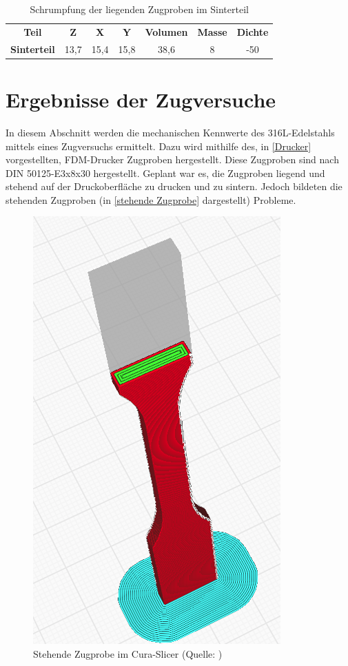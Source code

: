 \begin{table}[h]
    \centering
    \caption{Schrumpfung der liegenden Zugproben im Sinterteil}
      \begin{tabular}{ccccccc}
      \toprule
      \textbf{Teil} & \multicolumn{1}{c}{\textbf{Z}} & \multicolumn{1}{c}{\textbf{X}} & \multicolumn{1}{c}{\textbf{Y}} & \multicolumn{1}{c}{\textbf{Volumen}} & \multicolumn{1}{c}{\textbf{Masse}} & \multicolumn{1}{c}{\textbf{Dichte}} \\
        \textbf{Sinterteil} & 13,7 & 15,4 & 15,8 & 38,6 & 8 & -50 \\
      \bottomrule
      \end{tabular}%
    \label{Schrumpfung Zugproben}%
  \end{table}%
  \FloatBarrier

\section{Ergebnisse der Zugversuche}

In diesem Abschnitt werden die mechanischen Kennwerte des 316L-Edelstahls mittels eines Zugversuchs ermittelt. Dazu wird mithilfe des, in \autoref{Drucker} vorgestellten, FDM-Drucker Zugproben hergestellt. Diese Zugproben sind nach DIN 50125-E3x8x30 hergestellt.
Geplant war es, die Zugproben liegend und stehend auf der Druckoberfläche zu drucken und zu sintern. Jedoch bildeten die stehenden Zugproben (in \autoref{stehende Zugprobe} dargestellt) Probleme.

\begin{figure}[h] 
  \centering
  \includegraphics[width=0.5\linewidth]{bilder/Screenshot 2023-11-01 171423.png}
        \caption[Stehende Zugprobe im Cura-Slicer] {Stehende Zugprobe im Cura-Slicer (Quelle: \autocite{Prusa})}
  \label{stehende Zugprobe}
\end{figure}
\FloatBarrier


